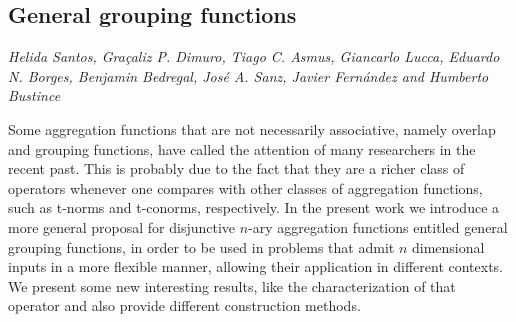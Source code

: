 \documentclass[../booklet.tex]{subfiles}
\begin{document}
\subsection[General grouping functions. {\it Helida Santos, Graçaliz P. Dimuro, Tiago C. Asmus, Giancarlo Lucca, Eduardo N. Borges, Benjamin Bedregal, José A. Sanz, Javier Fernández and Humberto Bustince}]{General grouping functions}
        

\begin{center}
  {\it Helida Santos, Graçaliz P. Dimuro, Tiago C. Asmus, Giancarlo Lucca, Eduardo N. Borges, Benjamin Bedregal, José A. Sanz, Javier Fernández and Humberto Bustince}
\end{center}

\vskip 0.8cm


Some aggregation functions that are not necessarily associative, namely overlap and grouping functions, have called the attention of many researchers in the recent past. This is probably due to the fact that they are a richer class of operators whenever one compares with other classes of aggregation functions, such as t-norms and t-conorms, respectively. In the present work we introduce a more general proposal for disjunctive $n$-ary aggregation functions entitled general grouping functions, in order to be used in problems that admit $n$ dimensional inputs in a more flexible manner, allowing their application in different contexts. We present some new interesting results, like the characterization of that operator and also provide different construction methods.

\end{document}
